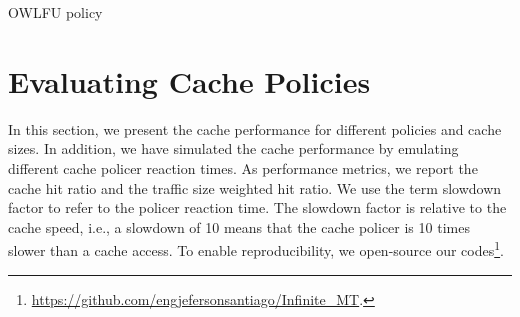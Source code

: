 \begin{algorithm}[]
\caption{OWLFU policy}
\label{algo:owlfu}
\SetInd{0.1em}{.9em}
\SetAlgoLined
\footnotesize
{}
%
%
%
%
%
\end{algorithm}

\section{Evaluating Cache Policies}

In this section, we present the cache performance for different policies and cache sizes.
In addition, we have simulated the cache performance by emulating different cache policer reaction times.
As performance metrics, we report the cache hit ratio and the traffic size weighted hit ratio.
We use the term slowdown factor to refer to the policer reaction time.
The slowdown factor is relative to the cache speed, i.e., a slowdown of 10 means that the cache policer is 10 times slower than a cache access.
To enable reproducibility, we open-source our codes\footnote{\url{https://github.com/engjefersonsantiago/Infinite_MT}.}.

